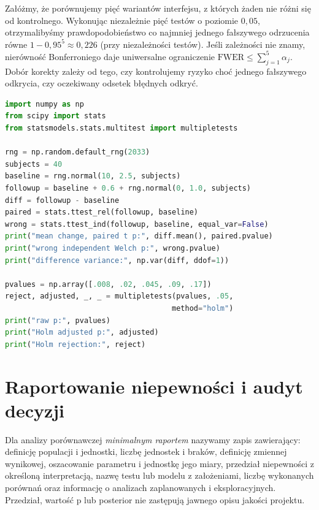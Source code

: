 \begin{przyklad}
Załóżmy, że porównujemy pięć wariantów interfejsu, z których żaden nie różni się od kontrolnego. Wykonując niezależnie pięć testów o poziomie $0{,}05$, otrzymalibyśmy prawdopodobieństwo co najmniej jednego fałszywego odrzucenia równe $1-0{,}95^5\approx0{,}226$ (przy niezależności testów). Jeśli zależności nie znamy, nierówność Bonferroniego daje uniwersalne ograniczenie $\mathrm{FWER}\le\sum_{j=1}^5\alpha_j$. Dobór korekty zależy od tego, czy kontrolujemy ryzyko choć jednego fałszywego odkrycia, czy oczekiwany odsetek błędnych odkryć.
\end{przyklad}

\begin{lstlisting}[language=Python,caption={Kompletny program: dane sparowane, poprawny test różnic i ilustracja wielokrotności (Python, NumPy, SciPy, statsmodels).}]
import numpy as np
from scipy import stats
from statsmodels.stats.multitest import multipletests

rng = np.random.default_rng(2033)
subjects = 40
baseline = rng.normal(10, 2.5, subjects)
followup = baseline + 0.6 + rng.normal(0, 1.0, subjects)
diff = followup - baseline
paired = stats.ttest_rel(followup, baseline)
wrong = stats.ttest_ind(followup, baseline, equal_var=False)
print("mean change, paired t p:", diff.mean(), paired.pvalue)
print("wrong independent Welch p:", wrong.pvalue)
print("difference variance:", np.var(diff, ddof=1))

pvalues = np.array([.008, .02, .045, .09, .17])
reject, adjusted, _, _ = multipletests(pvalues, .05,
                                      method="holm")
print("raw p:", pvalues)
print("Holm adjusted p:", adjusted)
print("Holm rejection:", reject)
\end{lstlisting}

\section{Raportowanie niepewności i audyt decyzji}
\begin{definicja}
Dla analizy porównawczej \emph{minimalnym raportem} nazywamy zapis zawierający: definicję populacji i jednostki, liczbę jednostek i braków, definicję zmiennej wynikowej, oszacowanie parametru i jednostkę jego miary, przedział niepewności z określoną interpretacją, nazwę testu lub modelu z założeniami, liczbę wykonanych porównań oraz informację o analizach zaplanowanych i eksploracyjnych. Przedział, wartość p lub posterior nie zastępują jawnego opisu jakości projektu.
\end{definicja}

